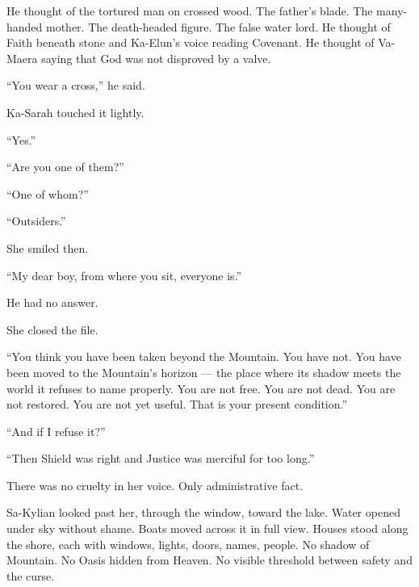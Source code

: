 He thought of the tortured man on crossed wood. The father’s blade. The many-handed mother. The death-headed figure. The false water lord. He thought of Faith beneath stone and Ka-Elun’s voice reading Covenant. He thought of Va-Maera saying that God was not disproved by a valve.\par

“You wear a cross,” he said.\par

Ka-Sarah touched it lightly.\par

“Yes.”\par

“Are you one of them?”\par

“One of whom?”\par

“Outsiders.”\par

She smiled then.\par

“My dear boy, from where you sit, everyone is.”\par

He had no answer.\par

She closed the file.\par

“You think you have been taken beyond the Mountain. You have not. You have been moved to the Mountain’s horizon — the place where its shadow meets the world it refuses to name properly. You are not free. You are not dead. You are not restored. You are not yet useful. That is your present condition.”\par

“And if I refuse it?”\par

“Then Shield was right and Justice was merciful for too long.”\par

There was no cruelty in her voice. Only administrative fact.\par

Sa-Kylian looked past her, through the window, toward the lake. Water opened under sky without shame. Boats moved across it in full view. Houses stood along the shore, each with windows, lights, doors, names, people. No shadow of Mountain. No Oasis hidden from Heaven. No visible threshold between safety and the curse.\par

